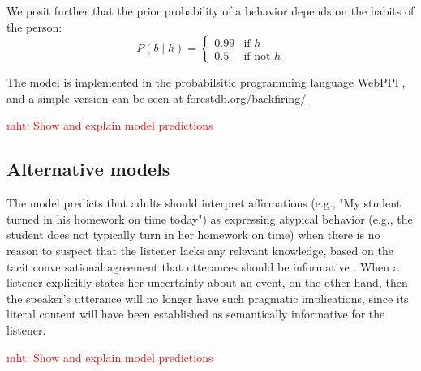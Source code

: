\documentclass[10pt,letterpaper]{article}
\newcommand{\red}[1]{\textcolor{Red}{#1}}
\begin{document}
We posit further that the prior probability of a behavior depends on the habits of the person:
$$
P(b \mid h) = \begin{cases}
0.99  & \text{if } h\\
0.5  & \text{if not } h
\end{cases}
$$

The model is implemented in the probabilsitic programming language WebPPl \cite{dippl}, and a simple version can be seen at \url{forestdb.org/backfiring/}

\red{mht: Show and explain model predictions}

\subsection{Alternative models}
The model predicts that adults should interpret affirmations (e.g., "My student turned in his homework on time today") as expressing atypical behavior (e.g., the student does not typically turn in her homework on time) when there is no reason to suspect that the listener lacks any relevant knowledge, based on the tacit conversational agreement that utterances should be informative \cite{Grice1975}.  When a listener explicitly states her uncertainty about an event, on the other hand, then the speaker's utterance will no longer have such pragmatic implications, since its literal content will have been established as semantically informative for the listener.

\red{mht: Show and explain model predictions}




\end{document}
